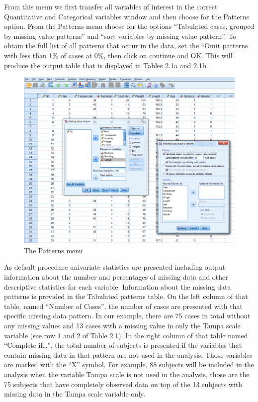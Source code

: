 \documentclass[]{book}
\theoremstyle{definition}
\theoremstyle{definition}
\theoremstyle{definition}
\theoremstyle{remark}
\begin{document}
From this menu we first transfer all variables of interest in the
correct Quantitative and Categorical variables window and then choose
for the Patterns option. From the Patterns menu choose for the options
``Tabulated cases, grouped by missing value patterns'' and ``sort
variables by missing value pattern''. To obtain the full list of all
patterns that occur in the data, set the ``Omit patterns with less than
1\% of cases at 0\%, then click on continue and OK. This will produce
the output table that is displayed in Tables 2.1a and 2.1b.

\begin{figure}

{\centering \includegraphics[width=0.9\linewidth]{images/fig2.4} 

}

\caption{The Patterns menu}\label{fig:fig30}
\end{figure}

As default procedure univariate statistics are presented including
output information about the number and percentages of missing data and
other descriptive statistics for each variable. Information about the
missing data patterns is provided in the Tabulated patterns table. On
the left column of that table, named ``Number of Cases'', the number of
cases are presented with that specific missing data pattern. In our
example, there are 75 cases in total without any missing values and 13
cases with a missing value in only the Tampa scale variable (see row 1
and 2 of Table 2.1). In the right column of that table named ``Complete
if\ldots{}'', the total number of subjects is presented if the variables
that contain missing data in that pattern are not used in the analysis.
Those variables are marked with the ``X'' symbol. For example, 88
subjects will be included in the analysis when the variable Tampa scale
is not used in the analysis, those are the 75 subjects that have
completely observed data on top of the 13 subjects with missing data in
the Tampa scale variable only.
\end{document}

